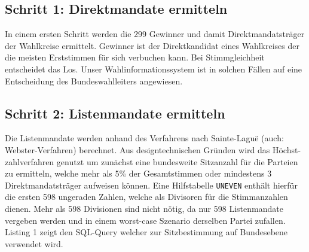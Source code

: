 \documentclass[a4paper]{article}
\begin{document}
\subsection{Schritt 1: Direktmandate ermitteln}

In einem ersten Schritt werden die 299 Gewinner und damit Direktmandatsträger der Wahlkreise ermittelt. Gewinner ist der Direktkandidat eines Wahlkreises der die meisten Erststimmen für sich verbuchen kann. Bei Stimmgleichheit entscheidet das Los. Unser Wahlinformationssystem ist in solchen Fällen auf eine Entscheidung des Bundeswahlleiters angewiesen.

\subsection{Schritt 2: Listenmandate ermitteln}

Die Listenmandate werden anhand des Verfahrens nach Sainte-Laguë (auch: Webster-Verfahren) berechnet. Aus designtechnischen Gründen wird das Höchst-zahlverfahren genutzt um zunächst eine bundesweite Sitzanzahl für die Parteien zu ermitteln, welche mehr als 5\% der Gesamtstimmen oder mindestens 3 Direktmandatsträger aufweisen können. Eine Hilfstabelle \texttt{UNEVEN} enthält hierfür die ersten 598 ungeraden Zahlen, welche als Divisoren für die Stimmanzahlen dienen. Mehr als 598 Divisionen sind nicht nötig, da nur 598 Listenmandate vergeben werden und in einem worst-case Szenario derselben Partei zufallen. Listing 1 zeigt den SQL-Query welcher zur Sitzbestimmung auf Bundesebene verwendet wird.
\end{document}
